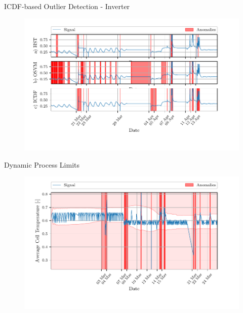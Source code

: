 \documentclass{beamer}
\begin{document}
\begin{frame}{ICDF-based Outlier Detection - Inverter}
    \begin{figure}[htpb]
        \begin{center}
            \includegraphics[width=\linewidth]{figures/Inverter_Temperature_sliding_compare_anomalies.pdf}
        \end{center}
    \end{figure}
\end{frame}

\begin{frame}{Dynamic Process Limits}
    \begin{figure}[htpb]
        \begin{center}
            \includegraphics[width=\linewidth]{figures/Average_Cell_Temperature_sliding_thresh_.pdf}
        \end{center}
    \end{figure}
\end{frame}
\end{document}
